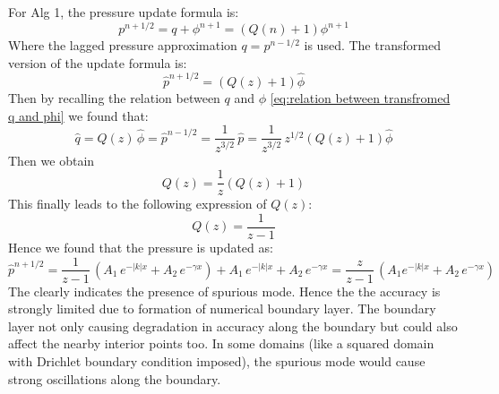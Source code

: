For Alg 1, the pressure update formula is:
\begin{equation}
p^{n+1/2} = q + \phi^{n+1} = (Q(n) + 1)\phi^{n+1}
\end{equation}
Where the lagged pressure approximation $q = p^{n-1/2}$ is used. The transformed version of the update formula is:\\
\begin{equation}\label{eq:transformed pressure update formula for Alg 1}
\hat{p}^{n+1/2} = (Q(z)+1)\hat{\phi}
\end{equation}
Then by recalling the relation between $q$ and $\phi$ \eqref{eq:relation between transfromed q and phi} we found that:
\begin{equation*}
\hat{q} = Q(z)\,\hat{\phi} = \hat{p}^{n-1/2} = \dfrac{1}{z^{3/2}}\,\hat{p} = \dfrac{1}{z^{3/2}} \, z^{1/2} (Q(z) + 1) \hat{\phi}
\end{equation*}
Then we obtain
\begin{equation*}
Q(z) = \dfrac{1}{z} (Q(z) + 1)
\end{equation*}
This finally leads to the following expression of $Q(z)$:
\begin{equation}
Q(z) = \dfrac{1}{z-1}
\end{equation}
Hence we found that the pressure is updated as:
\begin{dmath}
\hat{p}^{n+1/2} = \dfrac{1}{z-1}\,(A_1\,e^{-|k|x} + A_2 \,e^{-\gamma x}) + A_1\,e^{-|k|x} + A_2 \,e^{-\gamma x}
= \dfrac{z}{z-1}\,\left(A_1 e^{-|k|x} +  A_2 \,e^{-\gamma x}\right)
\end{dmath}
The clearly indicates the presence of spurious mode. Hence the the accuracy is strongly limited due to formation of numerical boundary layer. The boundary layer not only causing degradation in accuracy along the boundary but could also affect the nearby interior points too. In some domains (like a squared domain with Drichlet boundary condition imposed), the spurious mode would cause strong oscillations along the boundary.\\

